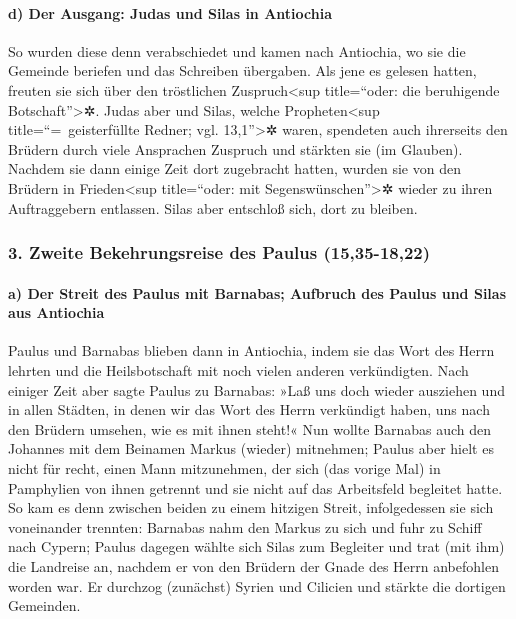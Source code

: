\hypertarget{d-der-ausgang-judas-und-silas-in-antiochia}{%
\paragraph{d) Der Ausgang: Judas und Silas in
Antiochia}\label{d-der-ausgang-judas-und-silas-in-antiochia}}

 So wurden diese denn verabschiedet und kamen nach
Antiochia, wo sie die Gemeinde beriefen und das Schreiben übergaben.
 Als jene es gelesen hatten, freuten sie sich über den
tröstlichen Zuspruch\textless sup title=``oder: die beruhigende
Botschaft''\textgreater✲.  Judas aber und Silas, welche
Propheten\textless sup title=``=~geisterfüllte Redner; vgl.
13,1''\textgreater✲ waren, spendeten auch ihrerseits den Brüdern durch
viele Ansprachen Zuspruch und stärkten sie (im Glauben). 
Nachdem sie dann einige Zeit dort zugebracht hatten, wurden sie von den
Brüdern in Frieden\textless sup title=``oder: mit
Segenswünschen''\textgreater✲ wieder zu ihren Auftraggebern entlassen.
 Silas aber entschloß sich, dort zu bleiben.

\hypertarget{zweite-bekehrungsreise-des-paulus-1535-1822}{%
\subsubsection{3. Zweite Bekehrungsreise des Paulus
(15,35-18,22)}\label{zweite-bekehrungsreise-des-paulus-1535-1822}}

\hypertarget{a-der-streit-des-paulus-mit-barnabas-aufbruch-des-paulus-und-silas-aus-antiochia}{%
\paragraph{a) Der Streit des Paulus mit Barnabas; Aufbruch des Paulus
und Silas aus
Antiochia}\label{a-der-streit-des-paulus-mit-barnabas-aufbruch-des-paulus-und-silas-aus-antiochia}}

 Paulus und Barnabas blieben dann in Antiochia, indem sie
das Wort des Herrn lehrten und die Heilsbotschaft mit noch vielen
anderen verkündigten.  Nach einiger Zeit aber sagte
Paulus zu Barnabas: »Laß uns doch wieder ausziehen und in allen Städten,
in denen wir das Wort des Herrn verkündigt haben, uns nach den Brüdern
umsehen, wie es mit ihnen steht!«  Nun wollte Barnabas
auch den Johannes mit dem Beinamen Markus (wieder) mitnehmen;
 Paulus aber hielt es nicht für recht, einen Mann
mitzunehmen, der sich (das vorige Mal) in Pamphylien von ihnen getrennt
und sie nicht auf das Arbeitsfeld begleitet hatte.  So
kam es denn zwischen beiden zu einem hitzigen Streit, infolgedessen sie
sich voneinander trennten: Barnabas nahm den Markus zu sich und fuhr zu
Schiff nach Cypern;  Paulus dagegen wählte sich Silas zum
Begleiter und trat (mit ihm) die Landreise an, nachdem er von den
Brüdern der Gnade des Herrn anbefohlen worden war.  Er
durchzog (zunächst) Syrien und Cilicien und stärkte die dortigen
Gemeinden.

